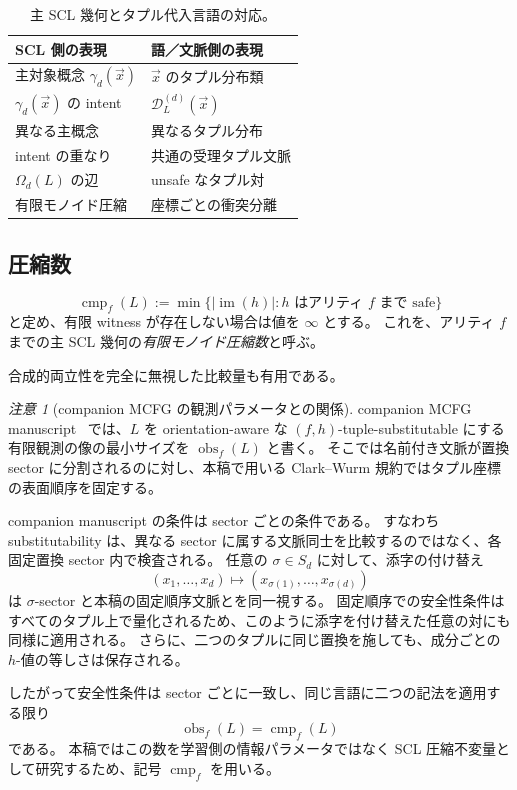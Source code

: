 \documentclass[10pt,a4paper]{ltjsarticle}
\theoremstyle{definition}
\theoremstyle{remark}
\newtheorem{remark}[theorem]{注意}
\newcommand{\cmp}{\operatorname{cmp}}
\newcommand{\obs}{\operatorname{obs}}
\newcommand{\D}{\mathcal D}
\newcommand{\Om}{\Omega}
\begin{document}
\begin{table}[t]
\centering
\caption{主 SCL 幾何とタプル代入言語の対応。}
\label{tab:scl-dictionary}
\begin{tabular}{@{}ll@{}}
\toprule
\textbf{SCL 側の表現} & \textbf{語／文脈側の表現}\\
\midrule
主対象概念 $\gamma_d(\vec x)$ & $\vec x$ のタプル分布類\\
$\gamma_d(\vec x)$ の intent & $\D_L^{(d)}(\vec x)$\\
異なる主概念 & 異なるタプル分布\\
intent の重なり & 共通の受理タプル文脈\\
$\Om_d(L)$ の辺 & unsafe なタプル対\\
有限モノイド圧縮 & 座標ごとの衝突分離\\
\bottomrule
\end{tabular}
\end{table}

\subsection{圧縮数}

\[
\cmp_f(L)
:=\min\{|\operatorname{im}(h)|:h\text{ はアリティ }f\text{ まで safe}\}
\]
と定め、有限 witness が存在しない場合は値を $\infty$ とする。
これを、アリティ $f$ までの主 SCL 幾何の\emph{有限モノイド圧縮数}と呼ぶ。

合成的両立性を完全に無視した比較量も有用である。

\begin{remark}[companion MCFG の観測パラメータとの関係]
\label{rem:obs-cmp-reindex}
companion MCFG manuscript~\cite{KuriyamaMCFG2026} では、$L$ を orientation-aware な $(f,h)$-tuple-substitutable にする有限観測の像の最小サイズを $\obs_f(L)$ と書く。
そこでは名前付き文脈が置換 sector に分割されるのに対し、本稿で用いる Clark--Wurm 規約ではタプル座標の表面順序を固定する。

companion manuscript の条件は sector ごとの条件である。
すなわち substitutability は、異なる sector に属する文脈同士を比較するのではなく、各固定置換 sector 内で検査される。
任意の $\sigma\in S_d$ に対して、添字の付け替え
\[
(x_1,\ldots,x_d)
\longmapsto
(x_{\sigma(1)},\ldots,x_{\sigma(d)})
\]
は $\sigma$-sector と本稿の固定順序文脈とを同一視する。
固定順序での安全性条件はすべてのタプル上で量化されるため、このように添字を付け替えた任意の対にも同様に適用される。
さらに、二つのタプルに同じ置換を施しても、成分ごとの $h$-値の等しさは保存される。

したがって安全性条件は sector ごとに一致し、同じ言語に二つの記法を適用する限り
\[
\obs_f(L)=\cmp_f(L)
\]
である。
本稿ではこの数を学習側の情報パラメータではなく SCL 圧縮不変量として研究するため、記号 $\cmp_f$ を用いる。
\end{remark}
\end{document}
